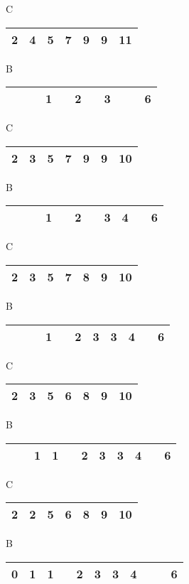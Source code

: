 \documentclass[10pt,fullpage]{article}
\begin{document}
C \begin{tabular}{|c|c|c|c|c|c|c|}
  \hline
  2 & 4 & 5 & 7 & 9 & 9 & 11 \\
  \hline
\end{tabular}

B \begin{tabular}{|c|c|c|c|c|c|c|c|c|c|c|}
  \hline
  &   &   & 1 &   & 2 &   & 3 &   & & 6 \\
  \hline
\end{tabular}

C \begin{tabular}{|c|c|c|c|c|c|c|}
  \hline
  2 & 3 & 5 & 7 & 9 & 9 & 10 \\
  \hline
\end{tabular}

B \begin{tabular}{|c|c|c|c|c|c|c|c|c|c|c|}
  \hline
  &   &   & 1 &   & 2 &   & 3 & 4 &  & 6 \\
  \hline
\end{tabular}

C \begin{tabular}{|c|c|c|c|c|c|c|}
  \hline
  2 & 3 & 5 & 7 & 8 & 9 & 10 \\
  \hline
\end{tabular}

B \begin{tabular}{|c|c|c|c|c|c|c|c|c|c|c|}
  \hline
  &   &   & 1 &   & 2 & 3 & 3 & 4 &  & 6 \\
  \hline
\end{tabular}

C \begin{tabular}{|c|c|c|c|c|c|c|}
  \hline
  2 & 3 & 5 & 6 & 8 & 9 & 10 \\
  \hline
\end{tabular}

B \begin{tabular}{|c|c|c|c|c|c|c|c|c|c|c|}
  \hline
  &   & 1 & 1 &   & 2 & 3 & 3 & 4 &  & 6 \\
  \hline
\end{tabular}

C \begin{tabular}{|c|c|c|c|c|c|c|}
  \hline
  2 & 2 & 5 & 6 & 8 & 9 & 10 \\
  \hline
\end{tabular}

B \begin{tabular}{|c|c|c|c|c|c|c|c|c|c|c|}
  \hline
  0 & 1 & 1 &   & 2 & 3 & 3 & 4 &  &  & 6 \\
  \hline
\end{tabular}
\end{document}
